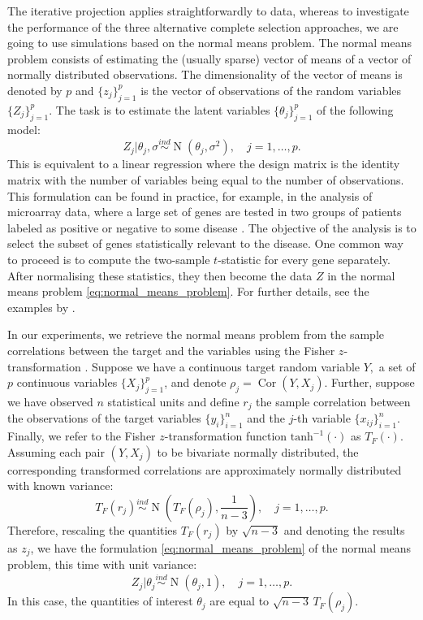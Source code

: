 \documentclass[a4]{article}
\theoremstyle{definition}
\DeclareMathOperator{\Cor}{Cor}
\DeclareMathOperator{\N}{N}
\begin{document}
The iterative projection applies straightforwardly to data, whereas
to investigate the performance of the three alternative complete selection approaches,
we are going to use simulations based on the normal means problem.
The normal means problem consists of estimating the (usually
sparse) vector of means of a vector of normally distributed
observations. The dimensionality of the vector of means is denoted by
$p$ and $\{z_{j}\}_{j=1}^{p}$ is the vector of observations of the
random variables $\{Z_{j}\}_{j=1}^{p}$. The task is to estimate the
latent variables $\{\theta_{j}\}_{j=1}^{p}$ of the following model: \
\begin{equation}\label{eq:normal_means_problem}
Z_{j}|\theta_{j},\sigma\overset{ind}{\sim}\N(\theta_{j},\sigma^{2}), \quad j=1,\ldots,p.
\end{equation}
This is equivalent to a linear regression where the design matrix is
the identity matrix with the number of variables being equal to the
number of observations. This formulation can be found in practice, for
example, in the analysis of microarray data, where a large set of
genes are tested in two groups of patients labeled as positive or
negative to some disease \citep{paper:efron,efron2012large}. The
objective of the analysis is to select the subset of genes
statistically relevant to the disease. One common way to proceed is to
compute the two-sample $t$-statistic for every gene separately.  After
normalising these statistics, they then become the data $Z$ in the
normal means problem \eqref{eq:normal_means_problem}. For further
details, see the examples by \cite{paper:efron, efron2012large}.

In our experiments, we retrieve the normal means problem from the
sample correlations between the target and the variables using the
Fisher $z$-transformation \citep{hawkins1989using}. Suppose we have a
continuous target random variable $Y,$ a set of $p$ continuous
variables $\{X_{j}\}_{j=1}^{p}$, and denote
$\rho_{j}=\Cor(Y,X_{j})$. Further, suppose we have observed $n$
statistical units and define $r_{j}$ the sample correlation between
the observations of the target variables $\{y_{i}\}_{i=1}^{n}$ and the
$j$-th variable $\{x_{ij}\}_{i=1}^{n}$. Finally, we refer to the
Fisher $z$-transformation function $\text{tanh}^{-1}(\cdot)$ as
$T_{F}(\cdot)$. Assuming each pair $(Y,X_{j})$ to be bivariate
normally distributed, the corresponding transformed correlations are
approximately normally distributed with known variance: \
\begin{equation} \label{eq:fisher_transformation}
T_{F}(r_{j})\overset{ind}{\sim} \N\left(T_{F}(\rho_{j}),\frac{1}{n-3}\right), \quad j=1,\ldots,p.
\end{equation}
Therefore, rescaling the quantities $T_{F}(r_{j})$ by $\sqrt{n-3}$ and
denoting the results as $z_{j}$, we have the formulation
\eqref{eq:normal_means_problem} of the normal means problem, this time
with unit variance: \
\begin{equation} \label{eq:normal_means_problem2}
Z_{j}|\theta_{j}\overset{ind}{\sim}\N(\theta_{j},1), \quad j=1,\ldots,p.
\end{equation}
In this case, the quantities of interest $\theta_{j}$ are equal to
$\sqrt{n-3}\,T_{F}(\rho_{j})$.
\end{document}
